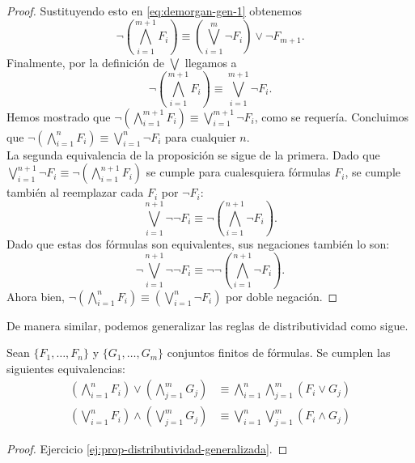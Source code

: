\documentclass[12pt,a4paper]{book}
\begin{document}
\begin{proof}
        Sustituyendo esto en \eqref{eq:demorgan-gen-1} obtenemos
        \begin{equation*}
            \neg\left(\bigwedge_{i=1}^{m+1}F_{i}\right)\equiv\left(\bigvee_{i=1}^{m}\neg F_{i}\right)\vee\neg F_{m+1}.
        \end{equation*}
        Finalmente, por la definición de $\bigvee$ llegamos a
        \begin{equation*}
            \neg\left(\bigwedge_{i=1}^{m+1}F_{i}\right)\equiv\bigvee_{i=1}^{m+1}\neg F_{i}.
        \end{equation*}
        Hemos mostrado que $\neg\left(\bigwedge_{i=1}^{m+1}F_{i}\right)\equiv\bigvee_{i=1}^{m+1}\neg F_{i}$, como se requería.
        Concluimos que $\neg\left(\bigwedge_{i=1}^{n}F_{i}\right)\equiv\bigvee_{i=1}^{n}\neg F_{i}$ para cualquier $n$.\\
        La segunda equivalencia de la proposición se sigue de la primera. Dado que
        $\bigvee_{i=1}^{n+1}\neg F_{i}\equiv\neg\left(\bigwedge_{i=1}^{n+1}F_{i}\right)$ se cumple para cualesquiera fórmulas
        $F_{i}$, se cumple también al reemplazar cada $F_{i}$ por $\neg F_{i}$:
        \begin{equation*}
            \bigvee_{i=1}^{n+1}\neg\neg F_{i}\equiv\neg\left(\bigwedge_{i=1}^{n+1}\neg F_{i}\right).
        \end{equation*}
        Dado que estas dos fórmulas son equivalentes, sus negaciones también lo son:
        \begin{equation*}
            \neg\bigvee_{i=1}^{n+1}\neg\neg F_{i}\equiv\neg\neg\left(\bigwedge_{i=1}^{n+1}\neg F_{i}\right).
        \end{equation*}
        Ahora bien, $\neg\left(\bigwedge_{i=1}^{n}F_{i}\right)\equiv\left(\bigvee_{i=1}^{n}\neg F_{i}\right)$ por doble negación.
    \end{proof}

    De manera similar, podemos generalizar las reglas de distributividad como sigue.

    \begin{proposicion}\label{prop:distributividad-generalizada}
        Sean $\{F_{1},\dots,F_{n}\}$ y $\{G_{1},\dots,G_{m}\}$ conjuntos finitos de fórmulas. Se cumplen las siguientes
        equivalencias:
        \begin{align*}
            \left(\bigwedge_{i=1}^{n}F_{i}\right)\vee\left(\bigwedge_{j=1}^{m}G_{j}\right)&\equiv
            \bigwedge_{i=1}^{n}\bigwedge_{j=1}^{m}(F_{i}\vee G_{j})\\
            \left(\bigvee_{i=1}^{n}F_{i}\right)\wedge\left(\bigvee_{j=1}^{m}G_{j}\right)&\equiv
            \bigvee_{i=1}^{n}\bigvee_{j=1}^{m}(F_{i}\wedge G_{j})
        \end{align*}
    \end{proposicion}
    \begin{proof}
        Ejercicio \ref{ej:prop-distributividad-generalizada}.
    \end{proof}
\end{document}
